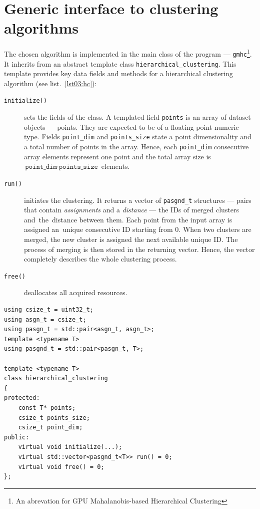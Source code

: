 \section{Generic interface to clustering algorithms}

The chosen algorithm is implemented in the main class of the program --- \texttt{gmhc}\footnote{An abrevation for GPU Mahalanobis-based Hierarchical Clustering}. It inherits from an abstract template class \texttt{hierarchical\_clustering}.
This template provides key data fields and methods for a hierarchical clustering algorithm (see list.~\ref{lst03:hc}): 

\begin{description}
	\item[\texttt{initialize()}] sets the fields of the class. A templated field \texttt{points} is an array of dataset objects --- points. They are expected to be of a floating-point numeric type. Fields \texttt{point\_dim} and \texttt{points\_size} state a point dimensionality and a total number of points in the array. Hence, each \texttt{point\_dim} consecutive array elements represent one point and the total array size is~$\texttt{point\_dim}\cdot\texttt{points\_size}$ elements.
	
	\item[\texttt{run()}] initiates the clustering. It returns a vector of \texttt{pasgnd\_t} structures --- pairs that contain \emph{assignments} and a \emph{distance} --- the IDs of merged clusters and~the~distance between them. Each point from the input array is assigned an~unique consecutive ID starting from $0$. When two clusters are merged, the new cluster is assigned the next available unique ID. The process of merging is then stored in the returning vector. Hence, the vector completely describes the whole clustering process.
	
	\item[\texttt{free()}] deallocates all acquired resources.
\end{description}

\begin{lstlisting}[caption={A summary of \texttt{hierarchical\_clustering} header file.},label={lst03:hc}]
using csize_t = uint32_t;
using asgn_t = csize_t;
using pasgn_t = std::pair<asgn_t, asgn_t>;
template <typename T>
using pasgnd_t = std::pair<pasgn_t, T>;

template <typename T>
class hierarchical_clustering
{
protected:
	const T* points;
	csize_t points_size;
	csize_t point_dim;
public:
	virtual void initialize(...);
	virtual std::vector<pasgnd_t<T>> run() = 0;
	virtual void free() = 0;
};
\end{lstlisting}

